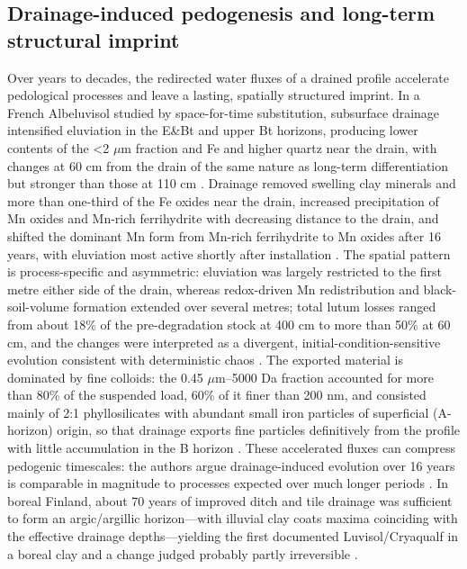 \subsection{Drainage-induced pedogenesis and long-term structural imprint}

Over years to decades, the redirected water fluxes of a drained profile accelerate
pedological processes and leave a lasting, spatially structured imprint. In a French
Albeluvisol studied by space-for-time substitution, subsurface drainage intensified
eluviation in the E\&Bt and upper Bt horizons, producing lower contents of the
\textless 2 $\mu$m fraction and Fe and higher quartz near the drain, with changes at
60 cm from the drain of the same nature as long-term differentiation but stronger than
those at 110 cm \parencite{Montagne2010}. Drainage removed swelling clay minerals and
more than one-third of the Fe oxides near the drain, increased precipitation of Mn
oxides and Mn-rich ferrihydrite with decreasing distance to the drain, and shifted the
dominant Mn form from Mn-rich ferrihydrite to Mn oxides after 16 years, with
eluviation most active shortly after installation \parencite{Montagne2008}. The
spatial pattern is process-specific and asymmetric: eluviation was largely restricted
to the first metre either side of the drain, whereas redox-driven Mn redistribution
and black-soil-volume formation extended over several metres; total lutum losses
ranged from about 18\% of the pre-degradation stock at 400 cm to more than 50\% at 60
cm, and the changes were interpreted as a divergent, initial-condition-sensitive
evolution consistent with deterministic chaos
\parencite{Montagne2013,Montagne2009}. The exported material is dominated by fine
colloids: the 0.45 $\mu$m--5000 Da fraction accounted for more than 80\% of the
suspended load, 60\% of it finer than 200 nm, and consisted mainly of 2:1
phyllosilicates with abundant small iron particles of superficial (A-horizon) origin,
so that drainage exports fine particles definitively from the profile with little
accumulation in the B horizon \parencite{Mercier2000}. These accelerated fluxes can
compress pedogenic timescales: the authors argue drainage-induced evolution over 16
years is comparable in magnitude to processes expected over much longer periods
\parencite{Montagne2010,Montagne2008}. In boreal Finland, about 70 years of improved
ditch and tile drainage was sufficient to form an argic/argillic horizon---with
illuvial clay coats maxima coinciding with the effective drainage depths---yielding
the first documented Luvisol/Cryaqualf in a boreal clay and a change judged probably
partly irreversible \parencite{YliHalla2009}.

